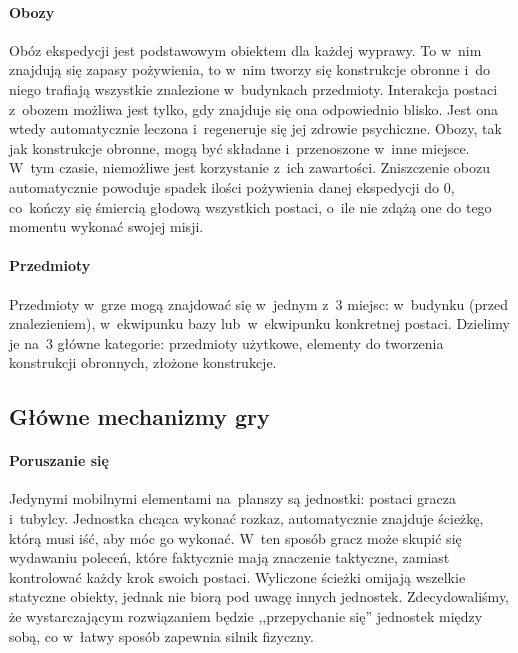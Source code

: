 \documentclass[licencjacka]{pracamgr}
\begin{document}
      \paragraph{Obozy}
        Obóz ekspedycji jest podstawowym obiektem dla każdej wyprawy. To w~nim znajdują się zapasy pożywienia, to w~nim
        tworzy się konstrukcje obronne i~do niego trafiają wszystkie znalezione w~budynkach przedmioty. Interakcja postaci
        z~obozem możliwa jest tylko, gdy znajduje się ona odpowiednio blisko. Jest ona wtedy automatycznie leczona
        i~regeneruje się jej zdrowie psychiczne. Obozy, tak jak konstrukcje obronne, mogą być składane i~przenoszone w~inne
        miejsce. W~tym czasie,	niemożliwe jest korzystanie z~ich zawartości. Zniszczenie obozu automatycznie powoduje
        spadek ilości pożywienia danej ekspedycji do 0, co~kończy się śmiercią głodową wszystkich postaci, o~ile nie zdążą 
        one do tego momentu wykonać swojej misji.
      \paragraph{Przedmioty}
        Przedmioty w~grze mogą znajdować się w~jednym z~3 miejsc: w~budynku (przed znalezieniem), w~ekwipunku bazy
        lub~w~ekwipunku konkretnej postaci. Dzielimy je na~3 główne kategorie: przedmioty użytkowe, elementy do tworzenia
        konstrukcji obronnych, złożone konstrukcje.

    \subsection{Główne mechanizmy gry}
      \paragraph{Poruszanie się}
        Jedynymi mobilnymi elementami na~planszy są jednostki: postaci gracza i~tubylcy. Jednostka chcąca wykonać rozkaz,
        automatycznie znajduje ścieżkę, którą musi iść, aby móc go wykonać. W~ten sposób gracz może skupić się wydawaniu
        poleceń, które faktycznie mają znaczenie taktyczne, zamiast kontrolować każdy krok swoich postaci. Wyliczone
        ścieżki omijają wszelkie statyczne obiekty, jednak nie biorą pod uwagę innych jednostek. Zdecydowaliśmy, że
        wystarczającym rozwiązaniem będzie ,,przepychanie się'' jednostek między sobą, co w~łatwy sposób zapewnia silnik
        fizyczny.
\end{document}
